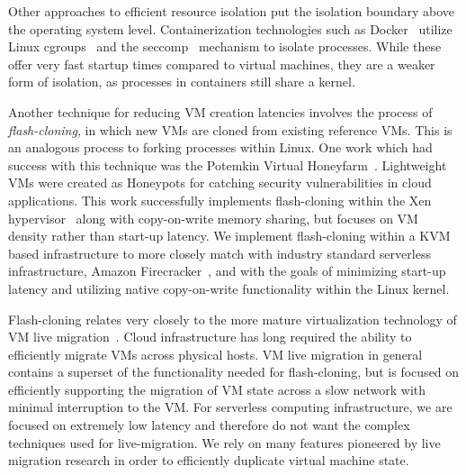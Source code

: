 Other approaches to efficient resource isolation put the isolation boundary
above the operating system level. Containerization technologies such as
Docker~\cite{docker} utilize Linux cgroups~\cite{cgroups} and the
seccomp~\cite{seccomp} mechanism to isolate processes. While these offer very
fast startup times compared to virtual machines, they are a weaker form of
isolation, as processes in containers still share a kernel.

Another technique for reducing VM creation latencies involves the process of
\emph{flash-cloning}, in which new VMs are cloned from existing reference VMs.
This is an analogous process to forking processes within Linux. One work which
had success with this technique was the Potemkin Virtual
Honeyfarm~\cite{potemkin}. Lightweight VMs were created as Honeypots for
catching security vulnerabilities in cloud applications. This work successfully
implements flash-cloning within the Xen hypervisor~\cite{xen} along with
copy-on-write memory sharing, but focuses on VM density rather than start-up
latency. We implement flash-cloning within a KVM based infrastructure to more
closely match with industry standard serverless infrastructure, Amazon
Firecracker~\cite{firecracker}, and with the goals of minimizing start-up
latency and utilizing native copy-on-write functionality within the Linux
kernel.

 Flash-cloning relates very closely to the more
mature virtualization technology of VM live
migration~\cite{post-copy-migration}\cite{snowflock}. Cloud infrastructure has
long required the ability to efficiently migrate VMs across physical hosts. VM
live migration in general contains a superset of the functionality needed for
flash-cloning, but is focused on efficiently supporting the migration of VM
state across a slow network with minimal interruption to the VM. For serverless
computing infrastructure, we are focused on extremely low latency and therefore
do not want the complex techniques used for live-migration. We rely on many
features pioneered by live migration research in order to efficiently duplicate
virtual machine state.

